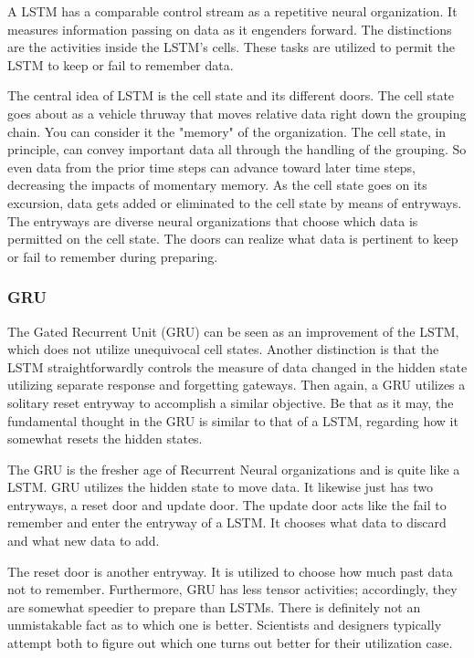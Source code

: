 A LSTM has a comparable control stream as a repetitive neural organization. It measures information passing on data as it engenders forward. The distinctions are the activities inside the LSTM's cells. These tasks are utilized to permit the LSTM to keep or fail to remember data. 

The central idea of LSTM is the cell state and its different doors. The cell state goes about as a vehicle thruway that moves relative data right down the grouping chain. You can consider it the "memory" of the organization. The cell state, in principle, can convey important data all through the handling of the grouping. So even data from the prior time steps can advance toward later time steps, decreasing the impacts of momentary memory. As the cell state goes on its excursion, data gets added or eliminated to the cell state by means of entryways. The entryways are diverse neural organizations that choose which data is permitted on the cell state. The doors can realize what data is pertinent to keep or fail to remember during preparing. 


\subsubsection{GRU}

The Gated Recurrent Unit (GRU) can be seen as an improvement of the LSTM, which does not utilize unequivocal cell states. Another distinction is that the LSTM straightforwardly controls the measure of data changed in the hidden state utilizing separate response and forgetting gateways. Then again, a GRU utilizes a solitary reset entryway to accomplish a similar objective. Be that as it may, the fundamental thought in the GRU is similar to that of a LSTM, regarding how it somewhat resets the hidden states. 

The GRU is the fresher age of Recurrent Neural organizations and is quite like a LSTM. GRU utilizes the hidden state to move data. It likewise just has two entryways, a reset door and update door. The update door acts like the fail to remember and enter the entryway of a LSTM. It chooses what data to discard and what new data to add.  

The reset door is another entryway. It is utilized to choose how much past data not to remember. Furthermore, GRU has less tensor activities; accordingly, they are somewhat speedier to prepare than LSTMs. There is definitely not an unmistakable fact as to which one is better. Scientists and designers typically attempt both to figure out which one turns out better for their utilization case.  

